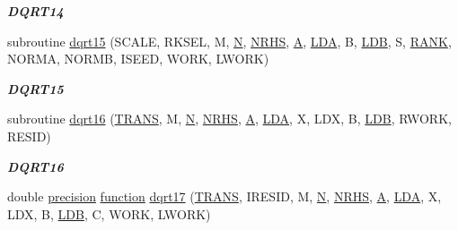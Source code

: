 \begin{DoxyCompactItemize}
\begin{DoxyCompactList}\small\item\em {\bfseries D\+Q\+R\+T14} \end{DoxyCompactList}\item 
subroutine \hyperlink{group__double__lin_ga2b2e3ad97569e899c170e6f18f7a8776}{dqrt15} (S\+C\+A\+L\+E, R\+K\+S\+E\+L, M, \hyperlink{polmisc_8c_a0240ac851181b84ac374872dc5434ee4}{N}, \hyperlink{example__user_8c_aa0138da002ce2a90360df2f521eb3198}{N\+R\+H\+S}, \hyperlink{classA}{A}, \hyperlink{example__user_8c_ae946da542ce0db94dced19b2ecefd1aa}{L\+D\+A}, B, \hyperlink{example__user_8c_a50e90a7104df172b5a89a06c47fcca04}{L\+D\+B}, S, \hyperlink{splinemodule_8c_a3a88bcc63386de30443dacede2e01847}{R\+A\+N\+K}, N\+O\+R\+M\+A, N\+O\+R\+M\+B, I\+S\+E\+E\+D, W\+O\+R\+K, L\+W\+O\+R\+K)
\begin{DoxyCompactList}\small\item\em {\bfseries D\+Q\+R\+T15} \end{DoxyCompactList}\item 
subroutine \hyperlink{group__double__lin_ga732090f9b672488f13e835c638005b4a}{dqrt16} (\hyperlink{superlu__enum__consts_8h_a0c4e17b2d5cea33f9991ccc6a6678d62a1f61e3015bfe0f0c2c3fda4c5a0cdf58}{T\+R\+A\+N\+S}, M, \hyperlink{polmisc_8c_a0240ac851181b84ac374872dc5434ee4}{N}, \hyperlink{example__user_8c_aa0138da002ce2a90360df2f521eb3198}{N\+R\+H\+S}, \hyperlink{classA}{A}, \hyperlink{example__user_8c_ae946da542ce0db94dced19b2ecefd1aa}{L\+D\+A}, X, L\+D\+X, B, \hyperlink{example__user_8c_a50e90a7104df172b5a89a06c47fcca04}{L\+D\+B}, R\+W\+O\+R\+K, R\+E\+S\+I\+D)
\begin{DoxyCompactList}\small\item\em {\bfseries D\+Q\+R\+T16} \end{DoxyCompactList}\item 
double \hyperlink{numinquire_8h_a2c8e616467665d0b2814d4c1589ba74e}{precision} \hyperlink{afunc_8m_a7b5e596df91eadea6c537c0825e894a7}{function} \hyperlink{group__double__lin_gaf3af5d86cf47cd362ae66f0cad11b159}{dqrt17} (\hyperlink{superlu__enum__consts_8h_a0c4e17b2d5cea33f9991ccc6a6678d62a1f61e3015bfe0f0c2c3fda4c5a0cdf58}{T\+R\+A\+N\+S}, I\+R\+E\+S\+I\+D, M, \hyperlink{polmisc_8c_a0240ac851181b84ac374872dc5434ee4}{N}, \hyperlink{example__user_8c_aa0138da002ce2a90360df2f521eb3198}{N\+R\+H\+S}, \hyperlink{classA}{A}, \hyperlink{example__user_8c_ae946da542ce0db94dced19b2ecefd1aa}{L\+D\+A}, X, L\+D\+X, B, \hyperlink{example__user_8c_a50e90a7104df172b5a89a06c47fcca04}{L\+D\+B}, C, W\+O\+R\+K, L\+W\+O\+R\+K)

\end{DoxyCompactItemize}
